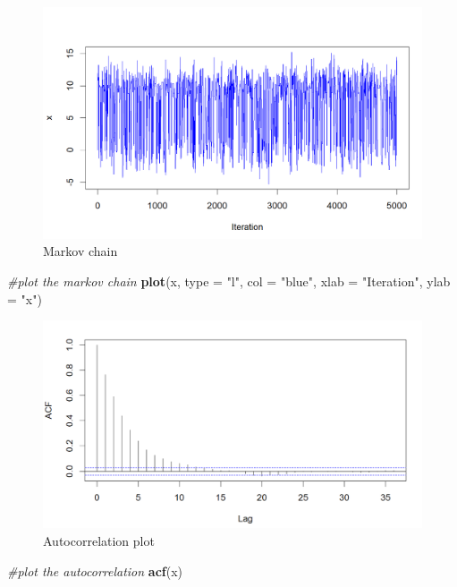\documentclass[
]{article}
\newenvironment{Shaded}{\begin{snugshade}}{\end{snugshade}}
\newcommand{\AttributeTok}[1]{\textcolor[rgb]{0.13,0.29,0.53}{#1}}
\newcommand{\CommentTok}[1]{\textcolor[rgb]{0.56,0.35,0.01}{\textit{#1}}}
\newcommand{\FunctionTok}[1]{\textcolor[rgb]{0.13,0.29,0.53}{\textbf{#1}}}
\newcommand{\NormalTok}[1]{#1}
\newcommand{\StringTok}[1]{\textcolor[rgb]{0.31,0.60,0.02}{#1}}
\begin{document}
\begin{figure}
\centering
\includegraphics[width=5.40625in,height=\textheight]{markov_chain.png}
\caption{Markov chain}
\end{figure}

\begin{Shaded}
\begin{Highlighting}[]
\CommentTok{\#plot the markov chain}
\FunctionTok{plot}\NormalTok{(x, }\AttributeTok{type =} \StringTok{"l"}\NormalTok{, }\AttributeTok{col =} \StringTok{"blue"}\NormalTok{, }\AttributeTok{xlab =} \StringTok{"Iteration"}\NormalTok{, }\AttributeTok{ylab =} \StringTok{"x"}\NormalTok{)}
\end{Highlighting}
\end{Shaded}

\begin{figure}
\centering
\includegraphics[width=5.59375in,height=\textheight]{acf.png}
\caption{Autocorrelation plot}
\end{figure}

\begin{Shaded}
\begin{Highlighting}[]
\CommentTok{\#plot the autocorrelation}
\FunctionTok{acf}\NormalTok{(x)}
\end{Highlighting}
\end{Shaded}
\end{document}

